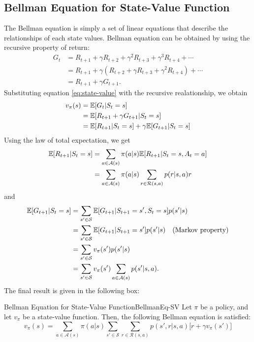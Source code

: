     \subsection{Bellman Equation for State-Value Function}
        The Bellman equation is simply a set of linear equations that describe the relationships of each state values.
        Bellman equation can be obtained by using the recursive property of return:
        \begin{align}
            G_t &= R_{t+1} + \gamma R_{t+2} + \gamma^2 R_{t+3} + \gamma^3 R_{t+4} + \cdots \\
                &= R_{t+1} + \gamma (R_{t+2} + \gamma R_{t+3} + \gamma^2 R_{t+4}) + \cdots \\
                &= R_{t+1} + \gamma G_{t+1}.
        \end{align}
        Substituting equation \ref{eq:state-value} with the recursive realationship, we obtain
        \begin{align}
            v_\pi(s) &= \mathbb{E}[G_t|S_t=s] \\
                     &= \mathbb{E}[R_{t+1} + \gamma G_{t+1}|S_t=s] \\
                     &= \mathbb{E}[R_{t+1}|S_t=s] + \gamma \mathbb{E}[G_{t+1}|S_t=s]
        \end{align} 
        Using the law of total expectation, we get
        \begin{align}
            \mathbb{E}[R_{t+1}|S_t=s] &= \sum_{a \in \mathcal{A}(s)}\pi(a|s)\mathbb{E}[R_{t+1}|S_t=s,A_t=a] \\
                              &= \sum_{a \in \mathcal{A}(s)}\pi(a|s)\sum_{r \in \mathcal{R}(s,a)}p(r|s,a)r
        \end{align}
        and
        \begin{align}
            \mathbb{E}[G_{t+1}|S_t=s] &= \sum_{s' \in \mathcal{S}}\mathbb{E}[G_{t+1}|S_{t+1}=s',S_t=s]p(s'|s) \\
                              &= \sum_{s' \in \mathcal{S}}\mathbb{E}[G_{t+1}|S_{t+1}=s']p(s'|s) \quad \text{(Markov property)} \\
                              &= \sum_{s' \in \mathcal{S}}v_\pi(s')p(s'|s) \\
                              &= \sum_{s' \in \mathcal{S}}v_\pi(s')\sum_{a \in \mathcal{A}(s)}p(s'|s,a).
        \end{align}
        The final result is given in the following box:
        \begin{thm}{Bellman Equation for State-Value Function}{BellmanEq-SV}
            Let $\pi$ be a policy, and let $v_\pi$ be a state-value function. Then, the following Bellman equation is satisfied:
            \begin{equation}
                v_\pi(s) = \sum_{a \in \mathcal{A}(s)}\pi(a|s)\sum_{s' \in \mathcal{S}}\sum_{r \in \mathcal{R}(s,a)}p(s',r|s,a)\big[ r + \gamma v_\pi(s') \big]
            \end{equation}
        \end{thm}
